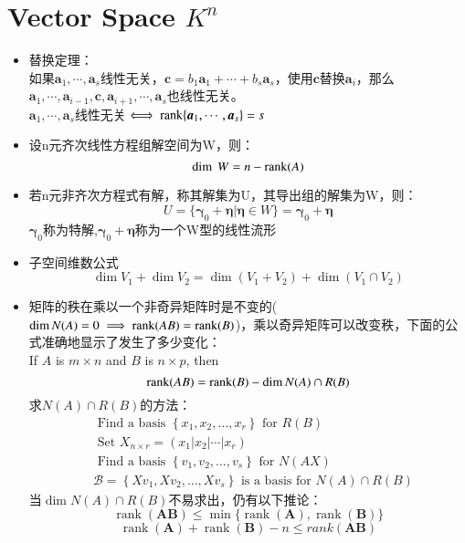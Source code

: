 \documentclass[UTF8,9pt]{ctexart}
\begin{document}
\section{Vector Space $K^n$}
\begin{itemize}
	\item 替换定理：\\
		如果$\bm{a}_1,\cdots,\bm{a}_s$线性无关，$\bm{c}=b_1\bm{a}_1+\cdots+b_s\bm{a}_s$，使用$\bm{c}$替换$\bm{a}_i$，那么$\bm{a}_1,\cdots,\bm{a}_{i-1},\bm{c},\bm{a}_{i+1},\cdots,\bm{a}_s$也线性无关。\\
		$\bm{a}_1,\cdots,\bm{a}_s$线性无关$\iff \mathrm{rank}\{\bm{a}_1,\cdots,\bm{a}_s\}=s$\\
	\item 设n元齐次线性方程组解空间为W，则：
		$$\dim\ W=n-\mathrm{rank}(A)$$
	\item 若n元非齐次方程式有解，称其解集为U，其导出组的解集为W，则：
		$$U=\{\bm{\gamma}_0+\bm{\eta}|\bm{\eta}\in W\}=\bm{\gamma}_0+\bm{\eta}$$
		$\bm{\gamma}_0$称为$\textbf{特解}$,$\bm{\gamma}_0+\bm{\eta}$称为一个W型的$\textbf{线性流形}$
	\item 子空间维数公式
		$$\dim V_1+\dim V_2= \dim(V_1+V_2)+\dim(V_1 \cap V_2)$$
	\item 矩阵的秩在乘以一个非奇异矩阵时是不变的($\dim N(A)=0 \implies \mathrm{rank}(AB)=\mathrm{rank} (B)$)，乘以奇异矩阵可以改变秩，下面的公式准确地显示了发生了多少变化：\\
		If $A$ is $m \times n$ and $B$ is $n \times p$, then
		$$\mathrm{rank}(AB) = \operatorname { rank } (B) -\dim N (A) \cap R (B) $$
		求$N (A) \cap R (B)$的方法：
		$$\begin{array} { rl } 
			& \text { Find a basis } \left\{ x _ { 1 } , x _ { 2 } , \ldots , x _ { r } \right\} \text { for } R ( B) \\
			&  \text { Set } X _ { n \times r } = \left( x _ { 1 } \left| x _ { 2 } \right| \cdots | x _ { r } \right)  \\
			&\text { Find a basis } \left\{ v _ { 1 } , v _ { 2 } , \ldots , v _ { s } \right\} \text { for } N (AX) \\ 
			&\mathcal { B }= \left\{ X v _ { 1 } , X v _ { 2 } , \ldots , X v _ { s } \right\} \text { is a basis for } N (A) \cap R (B)
		\end{array}$$
		当$\dim N (A) \cap R (B)$不易求出，仍有以下推论：
		$$\operatorname { rank } ( \mathbf { A B } ) \leq \min \{ \operatorname { rank } ( \mathbf { A } ) , \operatorname { rank } ( \mathbf { B } ) \}$$
		$$\operatorname { rank } ( \mathbf { A } ) + \operatorname { rank } ( \mathbf { B } ) - n \leq r a n k ( \mathbf { A B } )$$
\end{itemize}
\end{document}
